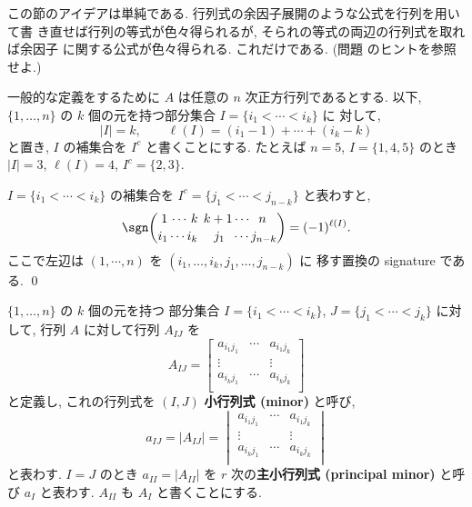 \documentclass[12pt,twoside]{jarticle}
\begin{document}
この節のアイデアは単純である. 行列式の余因子展開のような公式を行列を用いて書
き直せば行列の等式が色々得られるが, そられの等式の両辺の行列式を取れば余因子
に関する公式が色々得られる. これだけである.  
(問題  のヒントを参照せよ.)

一般的な定義をするために $A$ は任意の $n$ 次正方行列であるとする.
以下, $\{1,\dots,n\}$ の $k$ 個の元を持つ部分集合 $I=\{i_1<\cdots<i_k\}$ に
対して, 
\begin{equation*}
  |I|=k, \qquad \ell(I)=(i_1-1)+\cdots+(i_k-k)
\end{equation*}
と置き, $I$ の補集合を $I^c$ と書くことにする.  
たとえば $n=5$, $I=\{1,4,5\}$ のとき $|I|=3$, $\ell(I)=4$, $I^c=\{2,3\}$. 

\begin{question}
  $I=\{i_1<\cdots<i_k\}$ の補集合を $I^c=\{j_1<\cdots<j_{n-k}\}$ と表わすと,
  \begin{equation*}
    \sgn\binom
    { 1\, \cdots \,k\;\,         k+1     \cdots \;\; n\;\;}
    { i_1  \cdots i_k\,   \;\;\;\;j_1\;\; \cdots  j_{n-k}  }
    = (-1)^{\ell(I)}.
  \end{equation*}
  ここで左辺は $(1,\cdots,n)$ を $(i_1,\dots,i_k,j_1,\dots,j_{n-k})$ に
  移す置換の signature である. \qed
\end{question}


$\{1,\dots,n\}$ の $k$ 個の元を持つ
部分集合 $I=\{i_1<\cdots<i_k\}$, $J=\{j_1<\cdots<j_k\}$ に対して,
行列 $A$ に対して行列 $A_{IJ}$ を
\begin{equation*}
  A_{IJ} =
  \begin{bmatrix}
    a_{i_1j_1} & \cdots & a_{i_1j_k} \\
      \vdots   &        &   \vdots   \\
    a_{i_kj_1} & \cdots & a_{i_kj_k} \\
  \end{bmatrix}
\end{equation*}
と定義し, これの行列式を $(I,J)$ {\bf 小行列式 (minor)} と呼び,
\begin{equation*}
  a_{IJ} = |A_{IJ}| =
  \begin{vmatrix}
    a_{i_1j_1} & \cdots & a_{i_1j_k} \\
      \vdots   &        &   \vdots   \\
    a_{i_kj_1} & \cdots & a_{i_kj_k} \\
  \end{vmatrix}
\end{equation*}
と表わす.  $I=J$ のとき $a_{II}=|A_{II}|$ 
を $r$ 次の{\bf 主小行列式 (principal minor)} と呼び %
$a_I$ と表わす.
$A_{II}$ も $A_I$ と書くことにする.
\end{document}
